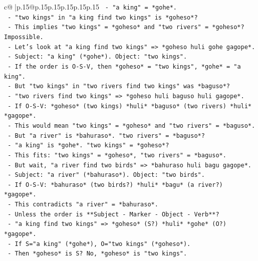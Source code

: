 \documentclass{article}
\begin{document}
{\begin{supertabular}{c@{$\;$}|p{.15\linewidth}@{}p{.15\linewidth}p{.15\linewidth}p{.15\linewidth}p{.15\linewidth}p{.15\linewidth}}
{{{\texttt{        {-} "a king" = *gohe*.} \\
\texttt{        {-} "two kings" in "a king find two kings" is *goheso*?} \\
\texttt{        {-} This implies "two kings" = *goheso* and "two rivers" = *goheso*? Impossible.} \\
\texttt{        {-} Let's look at "a king find two kings" => *goheso huli gohe gagope*.} \\
\texttt{          {-} Subject: "a king" (*gohe*). Object: "two kings".} \\
\texttt{          {-} If the order is O{-}S{-}V, then *goheso* = "two kings", *gohe* = "a king".} \\
\texttt{          {-} But "two kings" in "two rivers find two kings" was *baguso*?} \\
\texttt{          {-} "two rivers find two kings" => *goheso huli baguso huli gagope*.} \\
\texttt{          {-} If O{-}S{-}V: *goheso* (two kings) *huli* *baguso* (two rivers) *huli* *gagope*.} \\
\texttt{          {-} This would mean "two kings" = *goheso* and "two rivers" = *baguso*.} \\
\texttt{          {-} But "a river" is *bahuraso*. "two rivers" = *baguso*?} \\
\texttt{          {-} "a king" is *gohe*. "two kings" = *goheso*?} \\
\texttt{          {-} This fits: "two kings" = *goheso*, "two rivers" = *baguso*.} \\
\texttt{          {-} But wait, "a river find two birds" => *bahuraso huli bagu gagope*.} \\
\texttt{            {-} Subject: "a river" (*bahuraso*). Object: "two birds".} \\
\texttt{            {-} If O{-}S{-}V: *bahuraso* (two birds?) *huli* *bagu* (a river?) *gagope*.} \\
\texttt{            {-} This contradicts "a river" = *bahuraso*.} \\
\texttt{            {-} Unless the order is **Subject {-} Marker {-} Object {-} Verb**?} \\
\texttt{            {-} "a king find two kings" => *goheso* (S?) *huli* *gohe* (O?) *gagope*.} \\
\texttt{              {-} If S="a king" (*gohe*), O="two kings" (*goheso*).} \\
\texttt{              {-} Then *goheso* is S? No, *goheso* is "two kings".} \\
}}}
\end{supertabular}}
\end{document}
